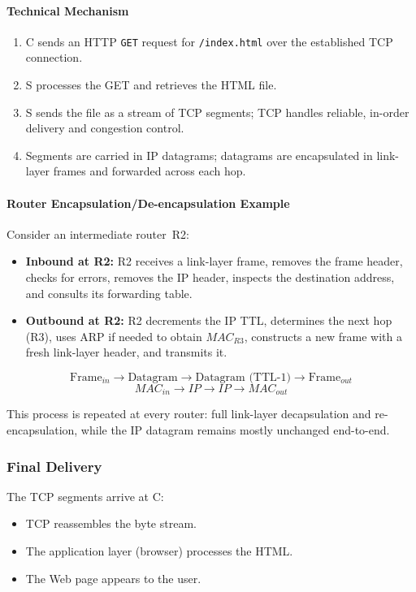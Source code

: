 \documentclass[12pt]{article}
\begin{document}
\paragraph{Technical Mechanism}
\begin{enumerate}
    \item C sends an HTTP \texttt{GET} request for \texttt{/index.html} over the established TCP connection.
    \item S processes the GET and retrieves the HTML file.
    \item S sends the file as a stream of TCP segments; TCP handles reliable, in-order delivery and congestion control.
    \item Segments are carried in IP datagrams; datagrams are encapsulated in link-layer frames and forwarded across each hop.
\end{enumerate}

\paragraph{Router Encapsulation/De-encapsulation Example}

Consider an intermediate router~R2:
\begin{itemize}
    \item \textbf{Inbound at R2:}
          R2 receives a link-layer frame, removes the frame header, checks for errors, removes the IP header, inspects the destination address, and consults its forwarding table.
    \item \textbf{Outbound at R2:}
          R2 decrements the IP TTL, determines the next hop (R3), uses ARP if needed to obtain $MAC_{R3}$, constructs a new frame with a fresh link-layer header, and transmits it.
\end{itemize}

\[
    \text{Frame}_{in} \to \text{Datagram} \to \text{Datagram (TTL-1)} \to \text{Frame}_{out}
\]
\[
    MAC_{in} \to IP \to IP \to MAC_{out}
\]

This process is repeated at every router: full link-layer decapsulation and re-encapsulation, while the IP datagram remains mostly unchanged end-to-end.

\subsubsection{Final Delivery}

The TCP segments arrive at C:
\begin{itemize}
    \item TCP reassembles the byte stream.
    \item The application layer (browser) processes the HTML.
    \item The Web page appears to the user.
\end{itemize}
\end{document}
